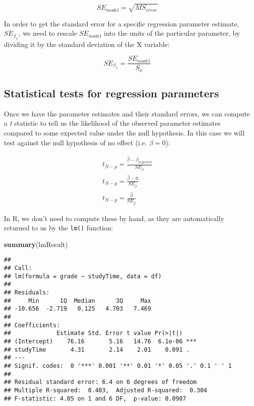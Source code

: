 \documentclass[]{book}
\newenvironment{Shaded}{\begin{snugshade}}{\end{snugshade}}
\newcommand{\KeywordTok}[1]{\textcolor[rgb]{0.13,0.29,0.53}{\textbf{#1}}}
\newcommand{\NormalTok}[1]{#1}
\theoremstyle{definition}
\theoremstyle{definition}
\theoremstyle{definition}
\theoremstyle{remark}
\begin{document}
\[
SE_{model} = \sqrt{MS_{error}}
\]

In order to get the standard error for a specific regression parameter
estimate, \(SE_{\beta_x}\), we need to rescale \(SE_{model}\) into the
units of the particular parameter, by dividing it by the standard
deviation of the X variable:

\[
SE_{\beta_x} = \frac{SE_{model}}{S_x}
\]

\subsection{Statistical tests for regression
parameters}\label{statistical-tests-for-regression-parameters}

Once we have the parameter estimates and their standard errors, we can
compute a \emph{t} statistic to tell us the likelihood of the observed
parameter estimates compared to some expected value under the null
hypothesis. In this case we will test against the null hypothesis of no
effect (i.e. \(\beta=0\)):

\[
\begin{array}{c}
t_{N - p} = \frac{\hat{\beta} - \beta_{expected}}{SE_{\hat{\beta}}}\\
t_{N - p} = \frac{\hat{\beta} - 0}{SE_{\hat{\beta}}}\\
t_{N - p} = \frac{\hat{\beta} }{SE_{\hat{\beta}}}
\end{array}
\]

In R, we don't need to compute these by hand, as they are automatically
returned to us by the \texttt{lm()} function:

\begin{Shaded}
\begin{Highlighting}[]
\KeywordTok{summary}\NormalTok{(lmResult)}
\end{Highlighting}
\end{Shaded}

\begin{verbatim}
## 
## Call:
## lm(formula = grade ~ studyTime, data = df)
## 
## Residuals:
##     Min      1Q  Median      3Q     Max 
## -10.656  -2.719   0.125   4.703   7.469 
## 
## Coefficients:
##             Estimate Std. Error t value Pr(>|t|)    
## (Intercept)    76.16       5.16   14.76  6.1e-06 ***
## studyTime       4.31       2.14    2.01    0.091 .  
## ---
## Signif. codes:  0 '***' 0.001 '**' 0.01 '*' 0.05 '.' 0.1 ' ' 1
## 
## Residual standard error: 6.4 on 6 degrees of freedom
## Multiple R-squared:  0.403,  Adjusted R-squared:  0.304 
## F-statistic: 4.05 on 1 and 6 DF,  p-value: 0.0907
\end{verbatim}
\end{document}
